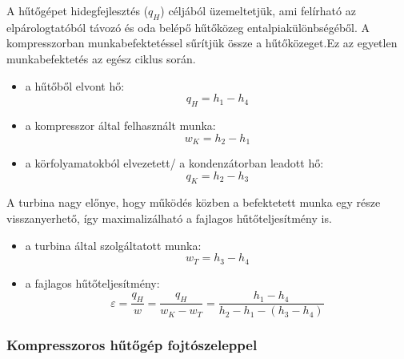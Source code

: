 A hűtőgépet hidegfejlesztés ($q_H$) céljából üzemeltetjük, ami felírható az elpárologtatóból távozó és oda belépő hűtőközeg entalpiakülönbségéből. A kompresszorban munkabefektetéssel sűrítjük össze a hűtőközeget.Ez az egyetlen munkabefektetés az egész ciklus során.
\begin{itemize}
	\item a hűtőből elvont hő:\begin{equation*}
	q_H=h_1-h_4
	\end{equation*}
	\item a kompresszor által felhasznált munka:\begin{equation*}
	w_K=h_2-h_1
	\end{equation*}
	\item a körfolyamatokból elvezetett/ a kondenzátorban leadott hő:\begin{equation*}
	q_K=h_2-h_3
	\end{equation*}
\end{itemize}
A turbina nagy előnye, hogy működés közben a befektetett munka egy része visszanyerhető, így maximalizálható a fajlagos hűtőteljesítmény is.
\begin{itemize}
		\item a turbina által szolgáltatott munka:\begin{equation*}
		w_T=h_3-h_4
	\end{equation*}
	\item a fajlagos hűtőteljesítmény:\begin{equation*}
		\varepsilon= \dfrac{q_{H}}{w}=\dfrac{q_H}{w_K-w_T}=\dfrac{h_1-h_4}{h_2-h_1-(h_3-h_4)}
	\end{equation*}
\end{itemize} 


\subsubsection{Kompresszoros hűtőgép fojtószeleppel}

